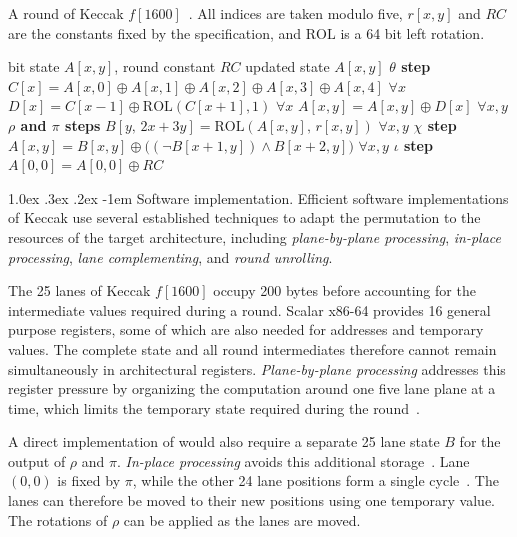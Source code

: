 \documentclass[journal=tches,submission]{iacrtrans}
\makeatletter
\renewcommand\paragraph{\@startsection{paragraph}{4}{\z@}%
      {1.0ex \@plus .3ex \@minus .2ex}%
      {-1em}%
      {\normalfont\normalsize\bfseries\SS@parafont}}
\makeatother
\begin{document}
\begin{algorithm}[!ht]
\caption{A round of Keccak $f[1600]$~\cite{FIPS202}. All indices are taken modulo five, $r[x,y]$ and $RC$ are the constants fixed by the specification, and $\mathrm{ROL}$ is a 64 bit left rotation.}
\label{alg:keccak}
\begin{algorithmic}[1]
 bit state $A[x,y]$, round constant $RC$
\Ensure updated state $A[x,y]$
\Statex \textbf{$\theta$ step}
\State $C[x] = A[x,0]\oplus A[x,1]\oplus A[x,2]\oplus A[x,3]\oplus A[x,4]$ \hfill $\forall x$
\State $D[x] = C[x-1]\oplus \mathrm{ROL}(C[x+1],1)$ \hfill $\forall x$
\State $A[x,y] = A[x,y]\oplus D[x]$ \hfill $\forall x,y$
\Statex \textbf{$\rho$ and $\pi$ steps}
\State $B[y,\,2x+3y] = \mathrm{ROL}(A[x,y],\,r[x,y])$ \hfill $\forall x,y$
\Statex \textbf{$\chi$ step}
\State $A[x,y] = B[x,y]\oplus\bigl((\lnot B[x+1,y])\wedge B[x+2,y]\bigr)$ \hfill $\forall x,y$
\Statex \textbf{$\iota$ step}
\State $A[0,0] = A[0,0]\oplus RC$
\end{algorithmic}
\end{algorithm}

\paragraph{Software implementation.}
Efficient software implementations of Keccak use several established techniques to adapt the permutation to the resources of the target architecture, including \emph{plane-by-plane processing}, \emph{in-place processing}, \emph{lane complementing}, and \emph{round unrolling}.

The 25 lanes of Keccak $f[1600]$ occupy 200 bytes before accounting for the intermediate values required during a round.
Scalar x86-64 provides 16 general purpose registers, some of which are also needed for addresses and temporary values.
The complete state and all round intermediates therefore cannot remain simultaneously in architectural registers.
\emph{Plane-by-plane processing} addresses this register pressure by organizing the computation around one five lane plane at a time, which limits the temporary state required during the round~\cite{KeccakImplementation}.

A direct implementation of  would also require a separate 25 lane state $B$ for the output of $\rho$ and $\pi$.
\emph{In-place processing} avoids this additional storage~\cite{KeccakImplementation}.
Lane $(0,0)$ is fixed by $\pi$, while the other 24 lane positions form a single cycle~\cite{MakingOfKeccak}.
The lanes can therefore be moved to their new positions using one temporary value.
The rotations of $\rho$ can be applied as the lanes are moved.
\end{document}
